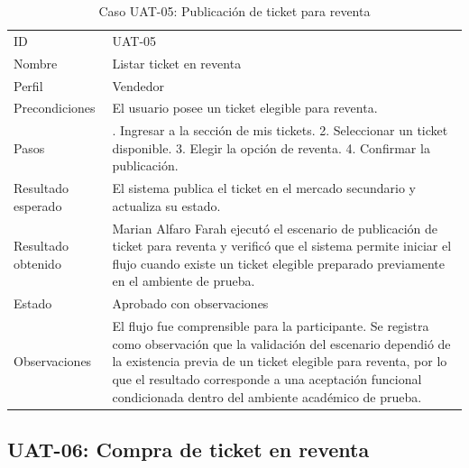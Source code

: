 \documentclass[12pt,letterpaper]{article}
\begin{document}
\begin{table}[H]
\centering
\begingroup
\footnotesize
\setlength{\tabcolsep}{3pt}
\renewcommand{\arraystretch}{1.25}

\begin{tabularx}{\textwidth}{|
>{\raggedright\arraybackslash}p{3.4cm}|
>{\raggedright\arraybackslash}X|}
\hline
\multicolumn{1}{|>{\centering\arraybackslash}m{3.4cm}|}{\textbf{Campo}} &
\multicolumn{1}{>{\centering\arraybackslash}m{10.8cm}|}{\textbf{Contenido}} \\
\hline
ID & UAT-05 \\
\hline
Nombre & Listar ticket en reventa \\
\hline
Perfil & Vendedor \\
\hline
Precondiciones & El usuario posee un ticket elegible para reventa. \\
\hline
Pasos & 1. Ingresar a la sección de mis tickets. 2. Seleccionar un ticket disponible. 3. Elegir la opción de reventa. 4. Confirmar la publicación. \\
\hline
Resultado esperado & El sistema publica el ticket en el mercado secundario y actualiza su estado. \\
\hline
Resultado obtenido & Marian Alfaro Farah ejecutó el escenario de publicación de ticket para reventa y verificó que el sistema permite iniciar el flujo cuando existe un ticket elegible preparado previamente en el ambiente de prueba. \\
\hline
Estado & Aprobado con observaciones \\
\hline
Observaciones & El flujo fue comprensible para la participante. Se registra como observación que la validación del escenario dependió de la existencia previa de un ticket elegible para reventa, por lo que el resultado corresponde a una aceptación funcional condicionada dentro del ambiente académico de prueba. \\
\hline
\end{tabularx}

\endgroup
\caption{Caso UAT-05: Publicación de ticket para reventa}
\label{tab:uat-05-publicacion-reventa}
\end{table}

\subsection{UAT-06: Compra de ticket en reventa}
\end{document}
